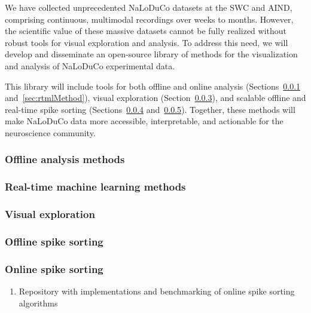 We have collected unprecedented NaLoDuCo datasets at the SWC and AIND,
comprising continuous, multimodal recordings over weeks to months. However, the
scientific value of these massive datasets cannot be fully realized without
robust tools for visual exploration and analysis. To address this need, we will
develop and disseminate an open-source library of methods for the visualization
and analysis of NaLoDuCo experimental data.

This library will include tools for both offline and online analysis
(Sections~\ref{sec:offlineAnalysisMethods}
and~\ref{sec:rtmlMethod}), visual exploration
(Section~\ref{sec:visualExploration}), and scalable offline and real-time spike
sorting (Sections~\ref{sec:offlineSpikeSorting}
and~\ref{sec:onlineSpikeSorting}). Together, these methods will make NaLoDuCo
data more accessible, interpretable, and actionable for the neuroscience
community.

\subsubsection{Offline analysis methods}
\label{sec:offlineAnalysisMethods}



\subsubsection{Real-time machine learning methods}
\label{sec:rtmlMethods}



\subsubsection{Visual exploration}
\label{sec:visualExploration}



\subsubsection{Offline spike sorting}
\label{sec:offlineSpikeSorting}



\subsubsection{Online spike sorting}
\label{sec:onlineSpikeSorting}


\begin{enumerate}

    \item Repository with implementations and benchmarking of online spike
        sorting algorithms

\end{enumerate}

